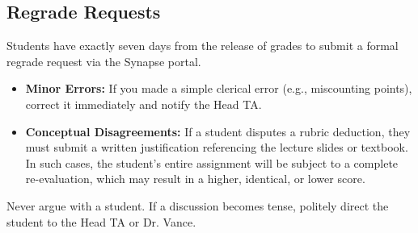 \subsection{Regrade Requests}
Students have exactly seven days from the release of grades to submit a formal regrade request via the Synapse portal.
\begin{itemize}
    \item \textbf{Minor Errors:} If you made a simple clerical error (e.g., miscounting points), correct it immediately and notify the Head TA.
    \item \textbf{Conceptual Disagreements:} If a student disputes a rubric deduction, they must submit a written justification referencing the lecture slides or textbook. In such cases, the student's entire assignment will be subject to a complete re-evaluation, which may result in a higher, identical, or lower score.
\end{itemize}
Never argue with a student. If a discussion becomes tense, politely direct the student to the Head TA or Dr. Vance.
